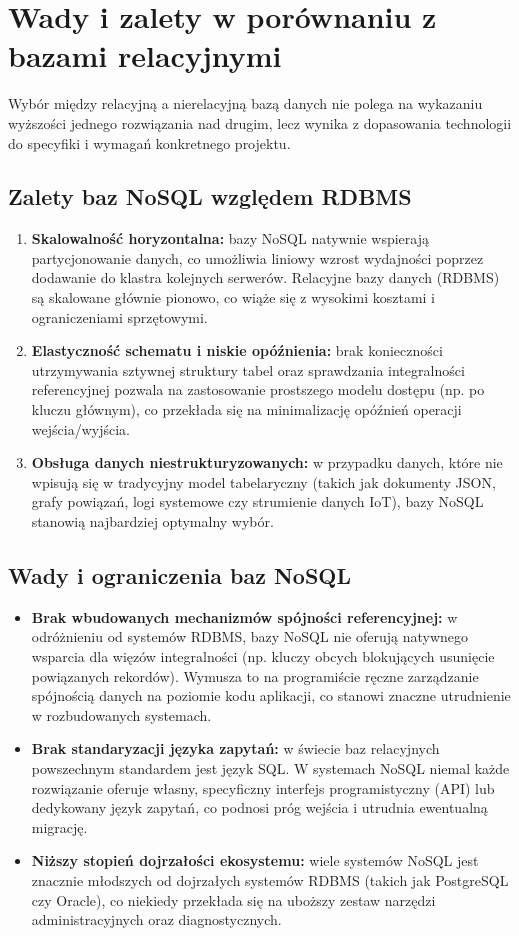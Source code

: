 \section{Wady i zalety w porównaniu z bazami relacyjnymi}
Wybór między relacyjną a nierelacyjną bazą danych nie polega na wykazaniu wyższości jednego rozwiązania nad drugim, lecz wynika z dopasowania technologii do specyfiki i wymagań konkretnego projektu.
\subsection{Zalety baz NoSQL względem RDBMS}
\begin{enumerate}
    \item \textbf{Skalowalność horyzontalna:} bazy NoSQL natywnie wspierają partycjonowanie danych, co umożliwia liniowy wzrost wydajności poprzez dodawanie do klastra kolejnych serwerów. Relacyjne bazy danych (RDBMS) są skalowane głównie pionowo, co wiąże się z wysokimi kosztami i ograniczeniami sprzętowymi.
    \item \textbf{Elastyczność schematu i niskie opóźnienia:} brak konieczności utrzymywania sztywnej struktury tabel oraz sprawdzania integralności referencyjnej pozwala na zastosowanie prostszego modelu dostępu (np. po kluczu głównym), co przekłada się na minimalizację opóźnień operacji wejścia/wyjścia.
    \item \textbf{Obsługa danych niestrukturyzowanych:} w przypadku danych, które nie wpisują się w tradycyjny model tabelaryczny (takich jak dokumenty JSON, grafy powiązań, logi systemowe czy strumienie danych IoT), bazy NoSQL stanowią najbardziej optymalny wybór.
\end{enumerate}

\subsection{Wady i ograniczenia baz NoSQL}
\begin{itemize}
    \item \textbf{Brak wbudowanych mechanizmów spójności referencyjnej:} w odróżnieniu od systemów RDBMS, bazy NoSQL nie oferują natywnego wsparcia dla więzów integralności (np. kluczy obcych blokujących usunięcie powiązanych rekordów). Wymusza to na programiście ręczne zarządzanie spójnością danych na poziomie kodu aplikacji, co stanowi znaczne utrudnienie w rozbudowanych systemach.
    \item \textbf{Brak standaryzacji języka zapytań:} w świecie baz relacyjnych powszechnym standardem jest język SQL. W systemach NoSQL niemal każde rozwiązanie oferuje własny, specyficzny interfejs programistyczny (API) lub dedykowany język zapytań, co podnosi próg wejścia i utrudnia ewentualną migrację.
    \item \textbf{Niższy stopień dojrzałości ekosystemu:} wiele systemów NoSQL jest znacznie młodszych od dojrzałych systemów RDBMS (takich jak PostgreSQL czy Oracle), co niekiedy przekłada się na uboższy zestaw narzędzi administracyjnych oraz diagnostycznych.
\end{itemize}
